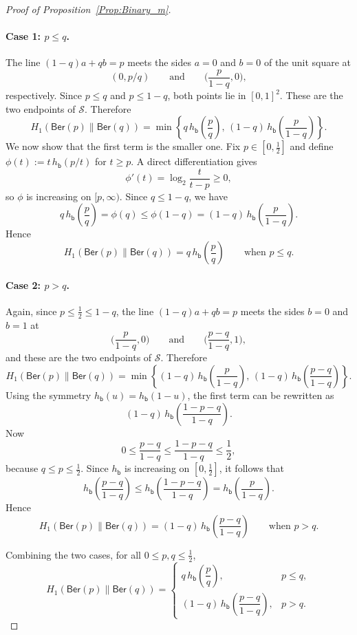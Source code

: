 \documentclass[journal]{IEEEtran}
\newcommand{\1}{\mathbf{1}}
\newcommand{\Ber}{\mathsf{Ber}}
\begin{document}
\begin{proof}[Proof of Proposition~\ref{Prop:Binary_m}]
\paragraph{Case 1: $p\le q$.}
The line \((1-q)a+qb=p\) meets the sides $a=0$ and $b=0$ of the unit square at
\[(0,p/q) \qquad\text{and}\qquad\Big(\frac{p}{1-q},0\Big),\]
respectively. Since $p\le q$ and $p\le 1-q$, both points lie in $[0,1]^2$. These are the two endpoints of $\mathcal S$. Therefore
\[H_1(\Ber(p)\|\Ber(q))
=\min\left\{
q\,h_{\mathsf{b}}\!\left(\frac{p}{q}\right),
\,(1-q)\,h_{\mathsf{b}}\!\left(\frac{p}{1-q}\right)
\right\}.\]
We now show that the first term is the smaller one. Fix $p\in[0,\frac12]$ and define \(\phi(t):=t\,h_{\mathsf{b}}(p/t)\) for $t\ge p$.
A direct differentiation gives
\[\phi'(t)=\log_2\!\frac{t}{t-p}\ge 0,\]
so $\phi$ is increasing on $[p,\infty)$. Since $q\le 1-q$, we have 
\[q\,h_{\mathsf{b}}\!\left(\frac{p}{q}\right) =\phi(q)\le\phi(1-q)=(1-q)\,h_{\mathsf{b}}\!\left(\frac{p}{1-q}\right).\]
Hence
\[H_1(\Ber(p)\|\Ber(q))=q\,h_{\mathsf{b}}\!\left(\frac{p}{q}\right)
\qquad\text{when } p\le q.\]

\paragraph{Case 2: $p>q$.}
Again, since $p\le \frac12\le 1-q$, the line \((1-q)a+qb=p\)
meets the sides $b=0$ and $b=1$ at \[
\Big(\frac{p}{1-q},0\Big) \qquad\text{and}\qquad \Big(\frac{p-q}{1-q},1\Big),\]
and these are the two endpoints of $\mathcal S$. Therefore
\[H_1(\Ber(p)\|\Ber(q))=\min\left\{
(1-q)\,h_{\mathsf{b}}\!\left(\frac{p}{1-q}\right),\,(1-q)\,h_{\mathsf{b}}\!\left(\frac{p-q}{1-q}\right)\right\}.\]
Using the symmetry $h_{\mathsf{b}}(u)=h_{\mathsf{b}}(1-u)$, the first term can be rewritten as
\[
(1-q)\,h_{\mathsf{b}}\!\left(\frac{1-p-q}{1-q}\right).
\]
Now
\[
0\le \frac{p-q}{1-q}\le \frac{1-p-q}{1-q}\le \frac12,
\]
because $q\le p\le \frac12$. Since $h_{\mathsf{b}}$ is increasing on $[0,\frac12]$, it follows that
\[
h_{\mathsf{b}}\!\left(\frac{p-q}{1-q}\right)
\le
h_{\mathsf{b}}\!\left(\frac{1-p-q}{1-q}\right)
=
h_{\mathsf{b}}\!\left(\frac{p}{1-q}\right).
\]
Hence
\[
H_1(\Ber(p)\|\Ber(q))
=
(1-q)\,h_{\mathsf{b}}\!\left(\frac{p-q}{1-q}\right)
\qquad\text{when } p>q.
\]

Combining the two cases, for all $0\le p,q\le \frac12$,
\[
H_1(\Ber(p)\|\Ber(q))
=
\begin{cases}
q\,h_{\mathsf{b}}\!\left(\dfrac{p}{q}\right), & p\le q,\\[1.2ex]
(1-q)\,h_{\mathsf{b}}\!\left(\dfrac{p-q}{1-q}\right), & p>q.
\end{cases}
\]
\end{proof}
\end{document}
